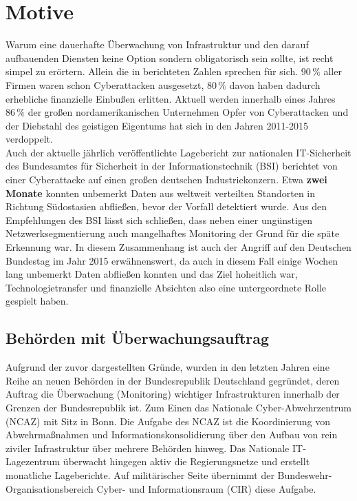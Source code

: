 \section{Motive}

Warum eine dauerhafte Überwachung von Infrastruktur und den darauf aufbauenden 
Diensten keine Option sondern obligatorisch sein sollte, ist recht simpel zu erörtern. 
Allein die in \cite[Seite 461]{francia} berichteten Zahlen sprechen für sich. $90\,\%$ 
aller 
Firmen waren schon Cyberattacken ausgesetzt, $80\,\%$ davon haben dadurch erhebliche 
finanzielle Einbußen erlitten. Aktuell werden innerhalb eines Jahres $86\,\%$ der großen 
nordamerikanischen Unternehmen Opfer von Cyberattacken und der Diebstahl des geistigen 
Eigentums hat sich in den Jahren 2011-2015 verdoppelt.\\
Auch der aktuelle jährlich veröffentlichte Lagebericht zur nationalen IT-Sicherheit des
Bundesamtes für Sicherheit in der Informationstechnik (BSI) \cite[Seite 
12]{bsi-lagebericht} 
berichtet von einer Cyberattacke auf einen großen deutschen Industriekonzern. Etwa 
\textbf{zwei 
Monate} konnten unbemerkt Daten aus weltweit verteilten Standorten in Richtung 
Südostasien abfließen, bevor der Vorfall detektiert wurde. Aus den Empfehlungen des BSI 
lässt sich schließen, dass neben einer ungünstigen Netzwerksegmentierung auch 
mangelhaftes Monitoring der Grund für die späte Erkennung war. In diesem Zusammenhang ist 
auch der Angriff auf den Deutschen Bundestag im Jahr 2015 erwähnenswert, da auch in 
diesem Fall einige Wochen lang unbemerkt Daten abfließen konnten und das Ziel 
hoheitlich war, Technologietransfer und finanzielle Absichten also eine untergeordnete 
Rolle gespielt haben.
\subsection{Behörden mit Überwachungsauftrag}

Aufgrund der zuvor dargestellten Gründe, wurden in den letzten Jahren eine Reihe an neuen 
Behörden in der Bundesrepublik Deutschland gegründet, deren Auftrag die Überwachung 
(Monitoring) wichtiger Infrastrukturen innerhalb der Grenzen der Bundesrepublik ist. Zum 
Einen das Nationale Cyber-Abwehrzentrum (NCAZ) \cite{web_ncaz} mit Sitz in Bonn. Die 
Aufgabe des NCAZ ist die Koordinierung von Abwehrmaßnahmen und Informationskonsolidierung 
über den Aufbau von rein ziviler Infrastruktur über mehrere Behörden hinweg. Das 
Nationale IT-Lagezentrum \cite{web_lagezentrum} überwacht hingegen aktiv die 
Regierungsnetze und erstellt monatliche Lageberichte. Auf militärischer Seite übernimmt 
der Bundeswehr-Organisationsbereich Cyber- und Informationsraum (CIR) diese Aufgabe.

